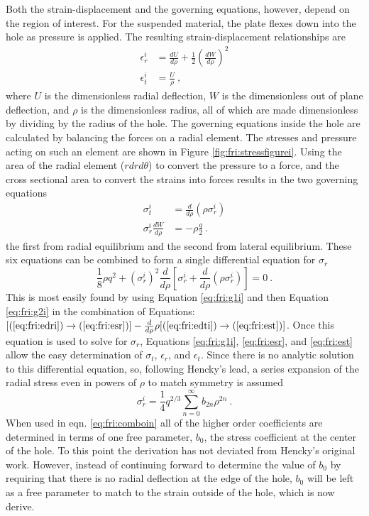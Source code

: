 Both the strain-displacement and the governing equations, however, depend on the region of interest.
For the suspended material, the plate flexes down into the hole as pressure is applied.
The resulting strain-displacement relationships are
\begin{align}
	\epsilon_r^i&=\frac{dU}{d\rho}+\frac{1}{2} (\frac{dW}{d\rho})^2 \label{eq:fri:edri}\\
	\epsilon_t^i&=\frac{U}{\rho} \label{eq:fri:edti} \ ,
\end{align}
where $U$ is the dimensionless radial deflection, $W$ is the dimensionless out of plane deflection, and $\rho$ is the dimensionless radius, all of which are made dimensionless by dividing by the radius of the hole.
The governing equations inside the hole are calculated by balancing the forces on a radial element.
The stresses and pressure acting on such an element are shown in Figure \ref{fig:fri:stressfigurei}.
Using the area of the radial element ($r dr d\theta$) to convert the pressure to a force, and the cross sectional area to convert the strains into forces results in the two governing equations
\begin{align}
	\sigma_t^i&=\frac{d}{d \rho}(\rho \sigma_r^i) \label{eq:fri:g1i}\\
	\sigma_r^i \frac{dW}{d \rho}&=-\rho \frac{q}{2} \label{eq:fri:g2i} \ .
\end{align}
the first from radial equilibrium and the second from lateral equilibrium.
These six equations can be combined to form a single differential equation for $\sigma_r$
\begin{equation}
	\frac{1}{8} \rho q^2+ (\sigma_r^i)^2 \frac{d}{d\rho}[\sigma_r^i+\frac{d}{d\rho}(\rho \sigma_r^i)]=0 \ .
	\label{eq:fri:comboin}
\end{equation}
This is most easily found by using Equation \ref{eq:fri:g1i} and then Equation \ref{eq:fri:g2i} in the combination of Equations: $[(\ref{eq:fri:edri}) \rightarrow (\ref{eq:fri:esr})]-\frac{d}{d \rho}\rho[(\ref{eq:fri:edti})\rightarrow(\ref{eq:fri:est})]$.
Once this equation is used to solve for $\sigma_r$, Equations \ref{eq:fri:g1i}, \ref{eq:fri:esr}, and \ref{eq:fri:est} allow the easy determination of $\sigma_t$, $\epsilon_r$, and $\epsilon_t$.
Since there is no analytic solution to this differential equation, so, following Hencky's lead, a series expansion of the radial stress even in powers of $\rho$ to match symmetry is assumed
\begin{equation}
	\sigma_r^i=\frac{1}{4} q^{2/3} \sum_{n=0}^{\infty} b_{2n} \rho^{2n} \ .
\end{equation}
When used in eqn. \ref{eq:fri:comboin} all of the higher order coefficients are determined in terms of one free parameter, $b_0$, the stress coefficient at the center of the hole.
To this point the derivation has not deviated from Hencky's original work.
However, instead of continuing forward to determine the value of $b_0$ by requiring that there is no radial deflection at the edge of the hole, $b_0$ will be left as a free parameter to match to the strain outside of the hole, which is now derive.

